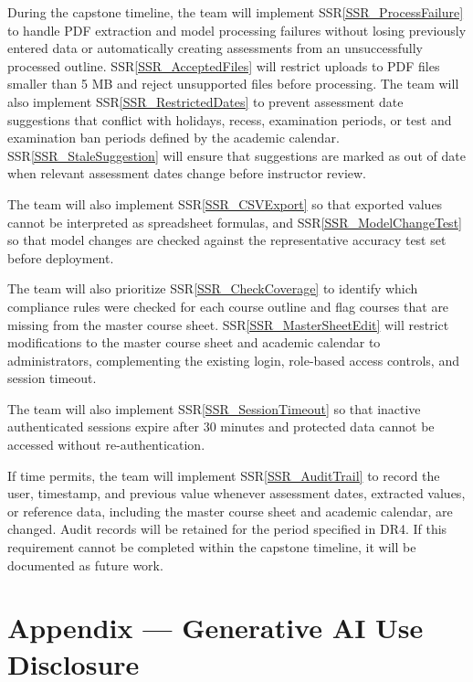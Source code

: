\documentclass{article}
\newcommand{\ssrref}[1]{SSR\ref{#1}}
\begin{document}
During the capstone timeline, the team will implement \ssrref{SSR_ProcessFailure} to handle PDF
extraction and model processing failures without losing previously entered
data or automatically creating assessments from an unsuccessfully processed
outline. \ssrref{SSR_AcceptedFiles} will restrict uploads to PDF files smaller than 5 MB and reject
unsupported files before processing. The team will also implement \ssrref{SSR_RestrictedDates} to
prevent assessment date suggestions that conflict with holidays, recess,
examination periods, or test and examination ban periods defined by the academic
calendar. \ssrref{SSR_StaleSuggestion} will ensure that suggestions are marked as out of date when
relevant assessment dates change before instructor review.

The team will also implement \ssrref{SSR_CSVExport} so that exported values
cannot be interpreted as spreadsheet formulas, and \ssrref{SSR_ModelChangeTest}
so that model changes are checked against the representative accuracy test set
before deployment.

The team will also prioritize \ssrref{SSR_CheckCoverage} to identify which compliance rules were
checked for each course outline and flag courses that are missing from the
master course sheet. \ssrref{SSR_MasterSheetEdit} will restrict modifications to the master course
sheet and academic calendar to administrators, complementing the existing
login, role-based access controls, and session timeout.

The team will also implement \ssrref{SSR_SessionTimeout} so that inactive
authenticated sessions expire after 30 minutes and protected data cannot be
accessed without re-authentication.

If time permits, the team will implement \ssrref{SSR_AuditTrail} to record the user, timestamp,
 and previous value whenever assessment dates, extracted values, or reference
 data, including the master course sheet and academic calendar, are changed.
 Audit records will be retained for the period specified in DR4.
 If this requirement cannot be completed within the capstone timeline, it
 will be documented as future work.
\newpage{}




\newpage{}

\section{Appendix --- Generative AI Use Disclosure}
\end{document}
